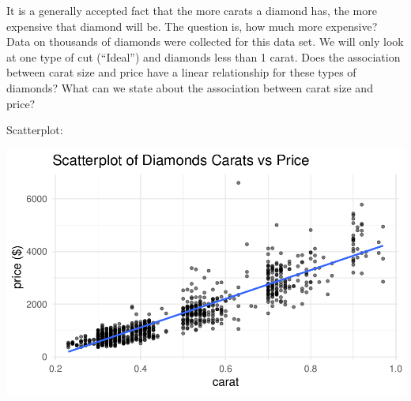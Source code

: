 \documentclass[
]{report}
\newenvironment{Shaded}{\begin{snugshade}}{\end{snugshade}}
\newcommand{\AttributeTok}[1]{\textcolor[rgb]{0.13,0.29,0.53}{#1}}
\newcommand{\CommentTok}[1]{\textcolor[rgb]{0.56,0.35,0.01}{\textit{#1}}}
\newcommand{\ConstantTok}[1]{\textcolor[rgb]{0.56,0.35,0.01}{#1}}
\newcommand{\FloatTok}[1]{\textcolor[rgb]{0.00,0.00,0.81}{#1}}
\newcommand{\FunctionTok}[1]{\textcolor[rgb]{0.13,0.29,0.53}{\textbf{#1}}}
\newcommand{\NormalTok}[1]{#1}
\newcommand{\SpecialCharTok}[1]{\textcolor[rgb]{0.81,0.36,0.00}{\textbf{#1}}}
\newcommand{\StringTok}[1]{\textcolor[rgb]{0.31,0.60,0.02}{#1}}
\begin{document}
It is a generally accepted fact that the more carats a diamond has, the more expensive that diamond will be. The question is, how much more expensive? Data on thousands of diamonds were collected for this data set. We will only look at one type of cut (``Ideal'') and diamonds less than 1 carat. Does the association between carat size and price have a linear relationship for these types of diamonds? What can we state about the association between carat size and price?

Scatterplot:

\begin{Shaded}
\end{Shaded}

\begin{center}\includegraphics[width=0.7\linewidth]{13-LN013-regression_files/figure-latex/unnamed-chunk-8-1} \end{center}
\end{document}
